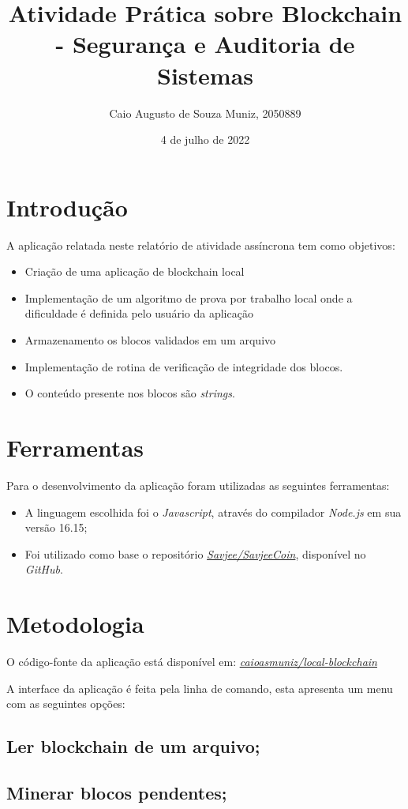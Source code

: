 \documentclass{article}
\title{Atividade Prática sobre Blockchain - Segurança e Auditoria de Sistemas}
\author{Caio Augusto de Souza Muniz, 2050889}
\date{4 de julho de 2022}
\begin{document}
\maketitle

\section{Introdução}
A aplicação relatada neste relatório de atividade assíncrona tem como objetivos:
\begin{itemize}
\item Criação de uma aplicação de blockchain local
\item Implementação de um algoritmo de prova por trabalho local onde a dificuldade é definida pelo usuário da aplicação
\item Armazenamento os blocos validados em um arquivo
\item Implementação de rotina de verificação de integridade dos blocos.
\item O conteúdo presente nos blocos são \textit{strings}.
\end{itemize}
\section{Ferramentas}
Para o desenvolvimento da aplicação foram utilizadas as seguintes ferramentas:
\begin{itemize}
\item A linguagem escolhida foi o \textit{Javascript}, através do compilador \textit{Node.js} em sua versão 16.15;
\item Foi utilizado como base o repositório \href{https://github.com/Savjee/SavjeeCoin}{\textit{Savjee/SavjeeCoin}}, disponível no \textit{GitHub}.
\end{itemize}
\section{Metodologia}
O código-fonte da aplicação está disponível em: \href{https://github.com/caioasmuniz/local-blockchain}{\textit{caioasmuniz/local-blockchain}}

A interface da aplicação é feita pela linha de comando, esta apresenta um menu com as seguintes opções:
\subsection{Ler blockchain de um arquivo;}

\subsection{Minerar blocos pendentes;}
\end{document}
